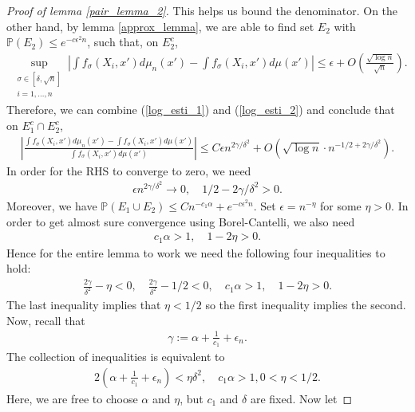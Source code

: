 \documentclass[10pt]{article}
\newcommand{\p}{\mathbb{P}}
\newenvironment{Proof of lemma}{\noindent{\bf Proof of Lemma}}{\hfill$\Box$\newline}
\newenvironment{Proof of claim}{\noindent{\bf Proof of claim}}{\hfill$\Box$\newline}
\newenvironment{Proof of theorem}{\noindent{\bf Proof of Theorem}}{\hfill\scriptsize{$\Box$}\newline}
\newenvironment{Proof of theorems}{\noindent{\bf Proof of Theorems}}{\hfill$\Box$\newline}
\newenvironment{Proof of proposition}{\noindent{\bf Proof of Proposition}}{\hfill$\Box$\newline}
\newenvironment{Proof of propositions}{\noindent{\bf Proof of Propositions}}{\hfill$\Box$\newline}
\newenvironment{Proof of exercise}{\noindent{\it Proof of Exercise:}}{\hfill$\Box$}
\numberwithin{equation}{section}
\begin{document}
\begin{proof}[Proof of lemma \ref{pair_lemma_2}]
    This helps us bound the denominator. On the other hand, by lemma \ref{approx_lemma}, we are able to find set $E_2$ with $\p(E_2) \leq e^{-c\epsilon^2 n}$, such that, on $E^c_2$,
    \begin{align} \label{log_esti_2}
        \sup_{\substack{\sigma \in [\delta,\sqrt{n}] \\ i = 1,\dots,n}} \left|\int f_{\sigma}(X_i,x')d\mu_n (x')-\int f_{\sigma}(X_i,x')d\mu (x')\right| \leq \epsilon + O\left(\frac{\sqrt{\log n}}{\sqrt{n}}\right).
    \end{align}
    Therefore, we can combine (\ref{log_esti_1}) and (\ref{log_esti_2}) and conclude that on $E_1^c \cap E_2^c$,
    \begin{align}
        \left|\frac{\int f_{\sigma}(X_i,x')d\mu_n (x')-\int f_{\sigma}(X_i,x')d\mu (x')}{\int f_{\sigma}(X_i,x')d\mu (x')} \right| \leq C\epsilon n^{2\gamma/\delta^2}+O(\sqrt{\log n} \cdot n^{-1/2 + 2\gamma/\delta^2}).
    \end{align}
    In order for the RHS to converge to zero, we need
    \begin{align}
        \epsilon n^{2\gamma/\delta^2} \to 0, \quad 1/2 - 2\gamma/\delta^2 > 0.
    \end{align}
    Moreover, we have $\p(E_1 \cup E_2) \leq Cn^{-c_1\alpha} + e^{-c \epsilon^2 n}$. Set $\epsilon = n^{-\eta}$ for some $\eta >0$. In order to get almost sure convergence using Borel-Cantelli, we also need
    \begin{align}
        c_1 \alpha>1, \quad 1-2\eta>0.
    \end{align}
    Hence for the entire lemma to work we need the following four inequalities to hold:
    \begin{align}
        \frac{2\gamma}{\delta^2}-\eta<0, \quad \frac{2\gamma}{\delta^2}-1/2<0, \quad c_1 \alpha>1, \quad 1-2\eta>0.
    \end{align}
    The last inequality implies that $\eta<1/2$ so the first inequality implies the second. Now, recall that
    \begin{align}
        \gamma := \alpha + \frac{1}{c_1} +\epsilon_n.
    \end{align}
    The collection of inequalities is equivalent to
    \begin{align} \label{inequ_collection}
        2\left(\alpha + \frac{1}{c_1} +\epsilon_n\right)<\eta \delta^2, \quad c_1 \alpha>1, 0<\eta<1/2.
    \end{align}
    Here, we are free to choose $\alpha$ and $\eta$, but $c_1$ and $\delta$ are fixed. Now let

\end{proof}
\end{document}
